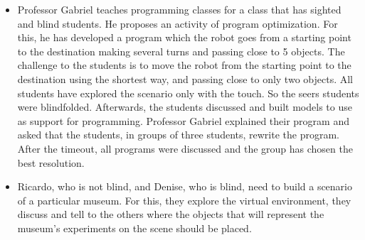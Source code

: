 \begin{itemize}
    \item Professor Gabriel teaches programming classes for a class that has sighted and blind students. He proposes an activity of program optimization. For this, he has developed a program which the robot goes from a starting point to the destination making several turns and passing close to 5 objects. The challenge to the students is to move the robot from the starting point to the destination using the shortest way, and passing close to only two objects. All students have explored the scenario only with the touch. So the seers students were blindfolded. Afterwards, the students discussed and built models to use as support for programming. Professor Gabriel explained their program and asked that the students, in groups of three students, rewrite the program. After the timeout, all programs were discussed and the group has chosen the best resolution.
    
    \item Ricardo, who is not blind, and Denise, who is blind, need to build a scenario of a particular museum. For this, they explore the virtual environment, they discuss and tell to the others where the objects that will represent the museum's experiments on the scene should be placed.

\end{itemize}